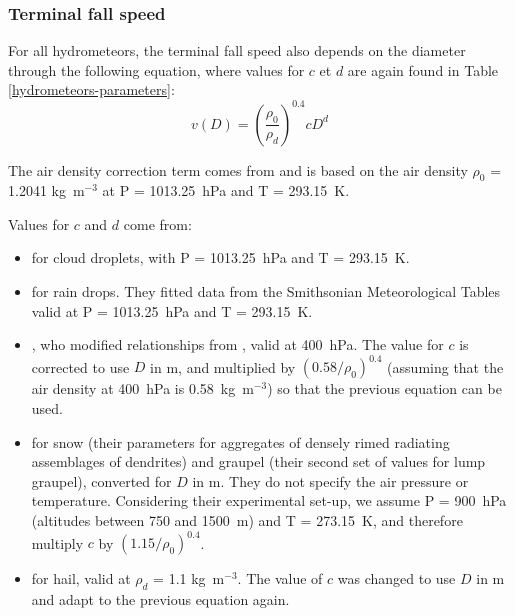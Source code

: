 \subsubsection{Terminal fall speed}

For all hydrometeors, the terminal fall speed also depends on the diameter through the following equation, where values for $c$ et $d$ are again found in Table \ref{hydrometeors-parameters}:
\begin{equation}
 v(D)=\left(\frac{\rho_{0}}{\rho_{d}}\right)^{0.4} cD^d
\end{equation}

The air density correction term comes from \citet{Foote1969} and is based on the air density $\rho_{0}$ = 1.2041 kg~m$^{-3}$ at P = 1013.25~hPa and T = 293.15~K.

Values for $c$ and $d$ come from:
\begin{itemize}
 \item \citet[][Eq.\ (10-138)]{Pruppacher1997} for cloud droplets, with P = 1013.25~hPa and T = 293.15~K.
 \item \citet[][Eq.\ (2.22)]{Liu1969} for rain drops. They fitted data from the Smithsonian Meteorological Tables \citep{List1958} valid at P = 1013.25~hPa and T = 293.15~K.
 \item \citet[][Table B.2, for sizes between 0 and 200 $\mu$m]{Starr1985}, who modified relationships from \citet{Heymsfield1972}, valid at 400~hPa. The value for $c$ is corrected to use $D$ in m, and multiplied by $(0.58/\rho_{0})^{0.4}$ (assuming that the air density at 400~hPa is 0.58~kg~m$^{-3}$) so that the previous equation can be used.
 \item \citet[][]{Locatelli1974} for snow (their parameters for aggregates of densely rimed radiating assemblages of dendrites) and graupel (their second set of values for lump graupel), converted for $D$ in m. They do not specify the air pressure or temperature. Considering their experimental set-up, we assume P = 900~hPa (altitudes between 750 and 1500~m) and T = 273.15~K, and therefore multiply $c$ by $(1.15/\rho_{0})^{0.4}$.
 \item \citet[][]{Bohm1989} for hail, valid at $\rho_d$ = 1.1 kg~m$^{-3}$. The value of $c$  was changed to use $D$ in m and adapt to the previous equation again.
\end{itemize}

